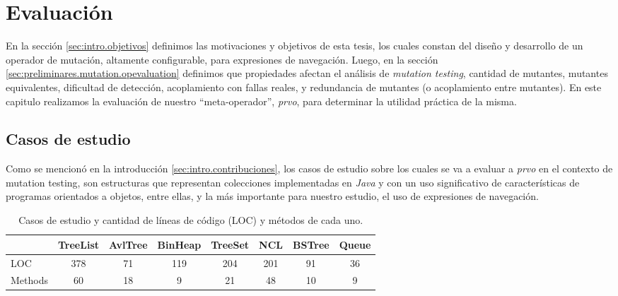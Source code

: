 \chapter[Evaluaci\'on]{Evaluaci\'on}
\label{cap:evaluation}

En la secci\'on \ref{sec:intro.objetivos} definimos las motivaciones y objetivos de esta tesis, los cuales constan del dise\~no y desarrollo de un operador de mutaci\'on, altamente configurable, para expresiones de navegaci\'on. Luego, en la secci\'on \ref{sec:preliminares.mutation.opevaluation} definimos que propiedades afectan el an\'alisis de \emph{mutation testing}, cantidad de mutantes, mutantes equivalentes, dificultad de detecci\'on, acoplamiento con fallas reales, y redundancia de mutantes (o acoplamiento entre mutantes). En este capitulo realizamos la evaluaci\'on de nuestro ``meta-operador'', \emph{prvo}, para determinar la utilidad pr\'actica de la misma.

\section{Casos de estudio}
\label{sec:evaluation.benchmark}

Como se mencion\'o en la introducci\'on \ref{sec:intro.contribuciones}, los casos de estudio sobre los cuales se va a evaluar a \emph{prvo} en el contexto de mutation testing, son estructuras que representan colecciones implementadas en \emph{Java} y con un uso significativo de caracter\'isticas de programas orientados a objetos, entre ellas, y la m\'as importante para nuestro estudio, el uso de expresiones de navegaci\'on. 

\begin{table}[]
	\begin{tabular}{l|ccccccc|}
		\cline{2-8}
		& TreeList & AvlTree & BinHeap & TreeSet & NCL & BSTree & \multicolumn{1}{l|}{Queue} \\ \hline
		\multicolumn{1}{|l|}{LOC} & \multicolumn{1}{c|}{378} & \multicolumn{1}{c|}{71} & \multicolumn{1}{c|}{119} & \multicolumn{1}{c|}{204} & \multicolumn{1}{c|}{201} & \multicolumn{1}{c|}{91} & 36 \\ \cline{1-1}
		\multicolumn{1}{|l|}{Methods} & \multicolumn{1}{c|}{60} & \multicolumn{1}{c|}{18} & \multicolumn{1}{c|}{9} & \multicolumn{1}{c|}{21} & \multicolumn{1}{c|}{48} & \multicolumn{1}{c|}{10} & 9 \\ \hline
	\end{tabular}
	\caption{Casos de estudio y cantidad de l\'ineas de c\'odigo (LOC) y m\'etodos de cada uno.}
	\label{tables.studyCases}
\end{table}

